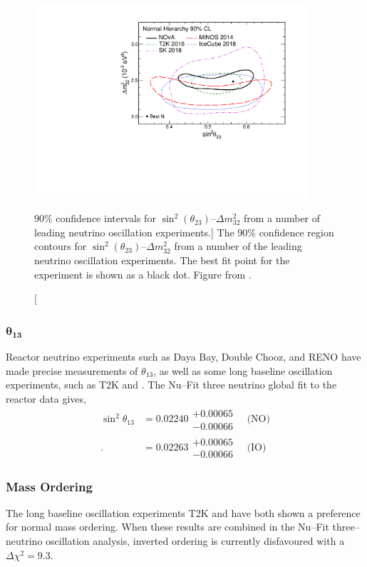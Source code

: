 \begin{figure}
	\centering
	\includegraphics[width=0.9\textwidth]{figures/theta23_msquare.pdf}
	\caption 
	[90\% confidence intervals for $\sin^2 (\theta_{23})$--$\Delta m^2_{32}$ from
	a number of leading neutrino oscillation experiments.]
	{The 90\% confidence region contours for 
	$\sin^2 (\theta_{23})$--$\Delta m^2_{32}$ from a number of the leading 
	neutrino oscillation experiments\cite{PhysRevD.96.092006, PhysRevLett.112.191801, PhysRevLett.123.151803}. 
	The best fit point for the \nova{} experiment is shown as a black dot.  
	Figure from \cite{PhysRevLett.123.151803}.}
	\label{fig:delm_sin23}
\end{figure}

\subsubsection*{$\boldsymbol{\theta_{13}}$}
Reactor neutrino experiments such as Daya Bay\cite{An:2012eh}, Double 
Chooz\cite{Abe:2013sxa}, and RENO\cite{Ahn:2012nd} have made precise
measurements of $\theta_{13}$, as well as some long baseline oscillation 
experiments, such as T2K and \nova. The Nu--Fit three neutrino global fit to 
the reactor data gives,
\begin{align*}
	\sin^2 \theta_{13} &= 0.02240 \substack{+ 0.00065 \\ - 0.00066} \quad \mbox{(NO)} \\ .
	                   &= 0.02263 \substack{+ 0.00065 \\ - 0.00066} \quad \mbox{(IO)}  
\end{align*}

\subsubsection*{Mass Ordering}
The long baseline oscillation experiments T2K and \nova have both shown a
preference for normal mass 
ordering\cite{PhysRevD.96.092006,PhysRevLett.123.151803}. When these results are
combined in the Nu--Fit three--neutrino oscillation analysis, inverted 
ordering is currently disfavoured with a $\Delta \chi^2 = 9.3$.

